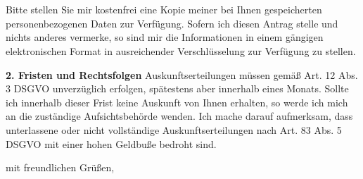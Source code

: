 \documentclass[a4paper, pagenumber=footmiddle, parskip=half,
	foldmarks=true,foldmarks=BmT, fromalign=right,
	fromphone=false, fromfax=false, fromemail=true, fromurl=false, fromlogo=false,
	fromrule=false, version=last]{scrlttr2}
\begin{document}
\begin{letter}{
	\EmpfaengerName\\
	\EmpfaengerStrasse\\
	\EmpfaengerStadt
}
Bitte stellen Sie mir kostenfrei eine Kopie meiner bei Ihnen gespeicherten personenbezogenen Daten zur Verfügung. Sofern ich diesen Antrag stelle und nichts anderes vermerke, so sind mir die Informationen in einem gängigen elektronischen Format in ausreichender Verschlüsselung zur Verfügung zu stellen.

\textbf{2. Fristen und Rechtsfolgen}
Auskunftserteilungen müssen gemäß Art. 12 Abs. 3 DSGVO unverzüglich erfolgen, spätestens aber innerhalb eines Monats. Sollte ich innerhalb dieser Frist keine Auskunft von Ihnen erhalten, so werde ich mich an die zuständige Aufsichtsbehörde wenden. Ich mache darauf aufmerksam, dass unterlassene oder nicht vollständige Auskunftserteilungen nach Art. 83 Abs. 5 DSGVO mit einer hohen Geldbuße bedroht sind.

\closing{mit freundlichen Grüßen,}


\end{letter}
\end{document}
